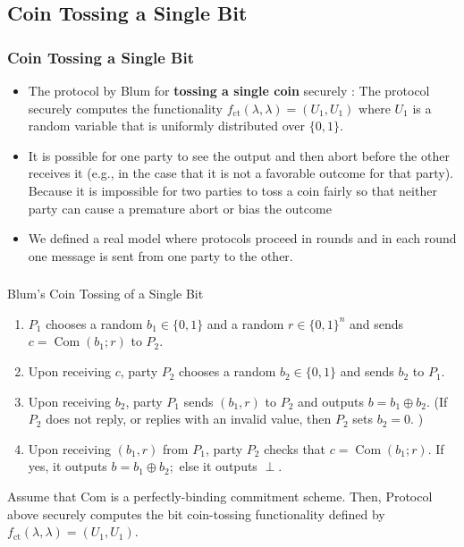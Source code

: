 \documentclass{beamer}
\begin{document}
    \subsection{Coin Tossing a Single Bit}
    \subsectionpage
    \begin{frame}
        \frametitle{Coin Tossing a Single Bit}
        \begin{itemize}
            \item The protocol by Blum for \textbf{tossing a single coin} securely : The protocol securely computes the functionality $f_{\mathrm{ct}}(\lambda, \lambda)=\left(U_{1}, U_{1}\right)$ where $U_{1}$ is a random variable that is uniformly distributed over $\{0,1\}$. 
            \item  It is possible for one party to see the output and then abort before the other receives it (e.g., in the case that it is not a favorable outcome for that party). Because it is impossible for two parties to toss a coin fairly so that neither party can cause a premature abort or bias the outcome
            \item We defined a real model where protocols proceed in rounds and in each round one message is sent from one party to the other.
        \end{itemize}
    
        
    
    \end{frame}

    \begin{frame}
        \frametitle{}
    
        \begin{block}{Blum’s Coin Tossing of a Single Bit}
            \begin{enumerate}
                \item $P_{1}$ chooses a random $b_{1} \in\{0,1\}$ and a random $r \in\{0,1\}^{n}$ and sends $c=\operatorname{Com}\left(b_{1} ; r\right)$ to $P_{2}$.
                \item Upon receiving $c$, party $P_{2}$ chooses a random $b_{2} \in\{0,1\}$ and sends $b_{2}$ to $P_{1}$.
                \item Upon receiving $b_{2}$, party $P_{1}$ sends $\left(b_{1}, r\right)$ to $P_{2}$ and outputs $b=b_{1} \oplus b_{2} .$ (If $P_{2}$ does not reply, or replies with an invalid value, then $P_{2}$ sets $b_{2}=0 .$ )
                \item Upon receiving $\left(b_{1}, r\right)$ from $P_{1}$, party $P_{2}$ checks that $c=\operatorname{Com}\left(b_{1} ; r\right) .$ If yes, it outputs $b=b_{1} \oplus b_{2} ;$ else it outputs $\perp$.
            \end{enumerate}
        \end{block}
        \begin{theorem}
            Assume that Com is a perfectly-binding commitment scheme. Then, Protocol above securely computes the bit coin-tossing functionality defined by $f_{\mathrm{ct}}(\lambda, \lambda)=\left(U_{1}, U_{1}\right) .$
        \end{theorem}
    
    \end{frame}
\end{document}
